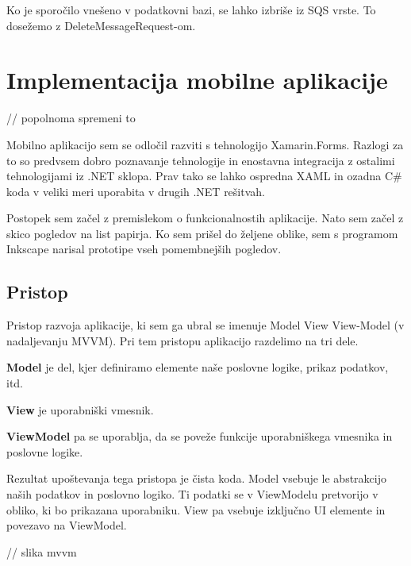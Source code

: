\documentclass[a4paper, 12pt]{book}
\begin{document}
Ko je sporočilo vnešeno v podatkovni bazi, se lahko izbriše iz SQS vrste.
To dosežemo z DeleteMessageRequest-om.


\section{Implementacija mobilne aplikacije}

// popolnoma spremeni to

Mobilno aplikacijo sem se odločil razviti s tehnologijo Xamarin.Forms.
Razlogi za to so predvsem dobro poznavanje tehnologije in enostavna integracija z ostalimi tehnologijami iz .NET sklopa.
Prav tako se lahko ospredna XAML in ozadna C\# koda v veliki meri uporabita v drugih .NET rešitvah.

Postopek sem začel z premislekom o funkcionalnostih aplikacije.
Nato sem začel z skico pogledov na list papirja.
Ko sem prišel do željene oblike, sem s programom Inkscape narisal prototipe vseh pomembnejših pogledov.

\subsection{Pristop}
Pristop razvoja aplikacije, ki sem ga ubral se imenuje Model View View-Model (v nadaljevanju MVVM).
Pri tem pristopu aplikacijo razdelimo na tri dele.

\textbf{Model} je del, kjer definiramo elemente naše poslovne logike, prikaz podatkov, itd.

\textbf{View} je uporabniški vmesnik.

\textbf{ViewModel} pa se uporablja, da se poveže funkcije uporabniškega vmesnika in poslovne logike.

Rezultat upoštevanja tega pristopa je čista koda.
Model vsebuje le abstrakcijo naših podatkov in poslovno logiko.
Ti podatki se v ViewModelu pretvorijo v obliko, ki bo prikazana uporabniku.
View pa vsebuje izključno UI elemente in povezavo na ViewModel.

// slika mvvm
\end{document}
